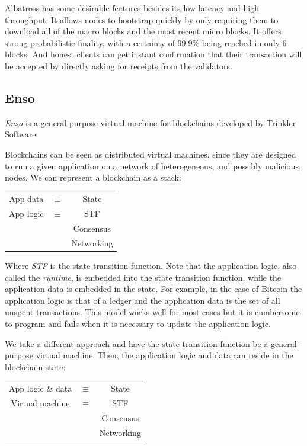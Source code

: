\documentclass[conference]{IEEEtran}
\begin{document}
Albatross has some desirable features besides its low latency and high throughput. It allows nodes to bootstrap quickly by only requiring them to download all of the macro blocks and the most recent micro blocks. It offers strong probabilistic finality, with a certainty of 99.9\% being reached in only 6 blocks. And honest clients can get instant confirmation that their transaction will be accepted by directly asking for receipts from the validators.

\subsection{Enso}
\textit{Enso} \cite{franca2019enso} is a general-purpose virtual machine for blockchains developed by Trinkler Software.

Blockchains can be seen as distributed virtual machines, since they are designed to run a given application on a network of heterogeneous, and possibly malicious, nodes. We can represent a blockchain as a stack:

\begin{center}
	\begin{tabular}{c c c}
		App data & $\equiv$ & State\\
		\cline{1-1} \cline{3-3}
		App logic & $\equiv$ & STF\\
		\cline{3-3}
		 &  & Consensus\\
		\cline{3-3}
		&  & Networking
	\end{tabular}
\end{center}

Where \textit{STF} is the state transition function. Note that the application logic, also called the \textit{runtime}, is embedded into the state transition function, while the application data is embedded in the state. For example, in the case of Bitcoin the application logic is that of a ledger and the application data is the set of all unspent transactions. This model works well for most cases but it is cumbersome to program and fails when it is necessary to update the application logic.

We take a different approach and have the state transition function be a general-purpose virtual machine. Then, the application logic and data can reside in the blockchain state:

\begin{center}
	\begin{tabular}{c c c}
		App logic \& data & $\equiv$ & State\\
		\cline{1-1} \cline{3-3}
		Virtual machine & $\equiv$ & STF\\
		\cline{3-3}
		 &  & Consensus\\
		\cline{3-3}
		&  & Networking
	\end{tabular}
\end{center}
\end{document}
